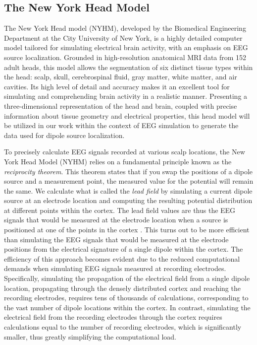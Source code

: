 \documentclass[a4paper, UKenglish, 11pt]{uiomaster}
\begin{document}
\subsection{The New York Head Model}
The New York Head model (NYHM), developed by the Biomedical Engineering Department at the City University of New York, is a highly detailed computer model tailored for simulating electrical brain activity, with an emphasis on EEG source localization. Grounded in high-resolution anatomical MRI data from 152 adult heads, this model allows the segmentation of six distinct tissue types within the head: scalp, skull, cerebrospinal fluid, gray matter, white matter, and air cavities. Its high level of detail and accuracy makes it an excellent tool for simulating and comprehending brain activity in a realistic manner. Presenting a three-dimensional representation of the head and brain, coupled with precise information about tissue geometry and electrical properties, this head model will be utilized in our work within the context of EEG simulation to generate the data used for dipole source localization.

To precisely calculate EEG signals recorded at various scalp locations, the New York Head Model (NYHM) relies on a fundamental principle known as the \emph{reciprocity theorem}. This theorem states that if you swap the positions of a dipole source and a measurement point, the measured value for the potential will remain the same. We calculate what is called the \emph{lead field} by simulating a current dipole source at an electrode location and computing the resulting potential distribution at different points within the cortex. The lead field values are thus the EEG signals that would be measured at the electrode location when a source is positioned at one of the points in the cortex \cite{naess2021biophysically}. This turns out to be more efficient than simulating the EEG signals that would be measured at the electrode positions from the electrical signature of a single dipole within the cortex. The efficiency of this approach becomes evident due to the reduced computational demands when simulating EEG signals measured at recording electrodes. Specifically, simulating the propagation of the electrical field from a single dipole location, propagating through the densely distributed cortex and reaching the recording electrodes, requires tens of thousands of calculations, corresponding to the vast number of dipole locations within the cortex. In contrast, simulating the electrical field from the recording electrodes through the cortex requires calculations equal to the number of recording electrodes, which is significantly smaller, thus greatly simplifying the computational load.
\end{document}
